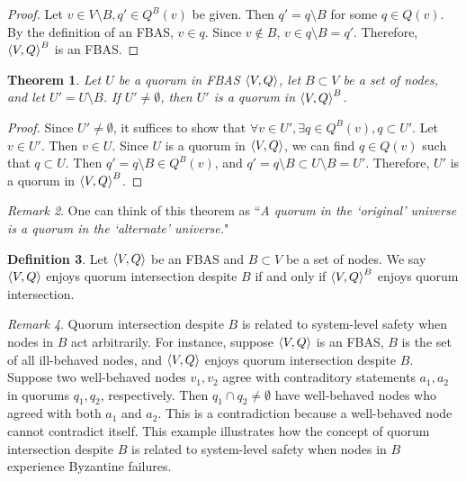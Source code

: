 \documentclass[12pt, psamsfonts]{amsart}
\newtheorem{thm}{Theorem}[section]
\theoremstyle{definition}
\newtheorem{defn}[thm]{Definition}
\theoremstyle{remark}
\newtheorem{rem}[thm]{Remark}
\numberwithin{equation}{section}
\begin{document}
\begin{proof}
    Let $v \in V \setminus B, q' \in Q^B(v)$ be given.
    Then $q' = q \setminus B$ for some $q \in Q(v)$.
    By the definition of an FBAS, $v \in q$.
    Since $v \notin B$, $v \in q \setminus B = q'$.
    Therefore, $\ev{V, Q}^B$ is an FBAS\@.
\end{proof}

\begin{thm}\label{quorum_intersection_projected_system}
    Let $U$ be a quorum in FBAS $\ev{V, Q}$, let $B \subset V$ be a set of nodes, and let $U' = U \setminus B$.
    If $U' \ne \emptyset$, then $U'$ is a quorum in $\ev{V, Q}^B$.
\end{thm}

\begin{proof}
    Since $U' \ne \emptyset$, it suffices to show that $\forall v \in U', \exists q \in Q^B(v), q \subset U'$.
    Let $v \in U'$.
    Then $v \in U$.
    Since $U$ is a quorum in $\ev{V, Q}$, we can find $q \in Q(v)$ such that $q \subset U$.
    Then $q' = q \setminus B \in Q^B(v)$, and $q' = q \setminus B \subset U \setminus B = U'$.
    Therefore, $U'$ is a quorum in $\ev{V, Q}^B$.
\end{proof}

\begin{rem}
    One can think of this theorem as ``\textit{A quorum in the `original' universe is a quorum in the `alternate' universe.}"
\end{rem}

\begin{defn}
    Let $\ev{V, Q}$ be an FBAS and $B \subset V$ be a set of nodes.
    We say $\ev{V, Q}$ enjoys quorum intersection despite $B$ if and only if $\ev{V, Q}^B$ enjoys quorum intersection.
\end{defn}

\begin{rem}
    Quorum intersection despite $B$ is related to system-level safety when nodes in $B$ act arbitrarily.
    For instance, suppose $\ev{V, Q}$ is an FBAS, $B$ is the set of all ill-behaved nodes, and $\ev{V, Q}$ enjoys quorum intersection despite $B$.
    Suppose two well-behaved nodes $v_1, v_2$ agree with contraditory statements $a_1, a_2$ in quorums $q_1, q_2$, respectively.
    Then $q_1 \cap q_2 \ne \emptyset$ have well-behaved nodes who agreed with both $a_1$ and $a_2$.
    This is a contradiction because a well-behaved node cannot contradict itself.
    This example illustrates how the concept of quorum intersection despite $B$ is related to system-level safety when nodes in $B$ experience Byzantine failures.
\end{rem}
\end{document}
